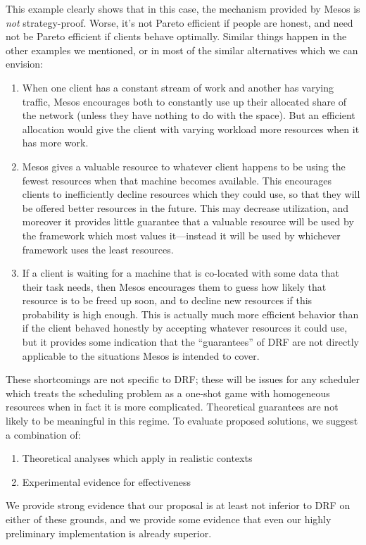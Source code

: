\documentclass{acm_proc_article-sp}
\begin{document}
This example clearly shows that in this case, the mechanism provided by Mesos is
\emph{not} strategy-proof. Worse, it’s not Pareto efficient if people are
honest, and need not be Pareto efficient if clients behave optimally. Similar
things happen in the other examples we mentioned, or in most of the similar
alternatives which we can envision:
\begin{enumerate}
  \item When one client has a constant stream of work and another has varying
    traffic, Mesos encourages both to constantly use up their allocated share of
    the network (unless they have nothing to do with the space). But an
    efficient allocation would give the client with varying workload more
    resources when it has more work. 
  \item Mesos gives a valuable resource to whatever client happens to be using
    the fewest resources when that machine becomes available. This encourages
    clients to inefficiently decline resources which they could use, so that
    they will be offered better resources in the future. This may decrease
    utilization, and moreover it provides little guarantee that a valuable
    resource will be used by the framework which most values it---instead it will
    be used by whichever framework uses the least resources.
  \item If a client is waiting for a machine that is co-located with some data
    that their task needs, then Mesos encourages them to guess how likely that
    resource is to be freed up soon, and to decline new resources if this
    probability is high enough. This is actually much more efficient behavior
    than if the client behaved honestly by accepting whatever resources it could
    use, but it provides some indication that the ``guarantees'' of DRF are not
    directly applicable to the situations Mesos is intended to cover.
  \end{enumerate}

These shortcomings are not specific to DRF; these will be issues for any
scheduler which treats the scheduling problem as a one-shot game with
homogeneous resources when in fact it is more complicated. Theoretical
guarantees are not likely to be meaningful in this regime. To evaluate proposed
solutions, we suggest a combination of:
\begin{enumerate}
  \item Theoretical analyses which apply in realistic contexts
  \item Experimental evidence for effectiveness
\end{enumerate}
We provide strong evidence that our proposal is at least not inferior to DRF on
either of these grounds, and we provide some evidence that even our highly
preliminary implementation is already superior.
\end{document}

